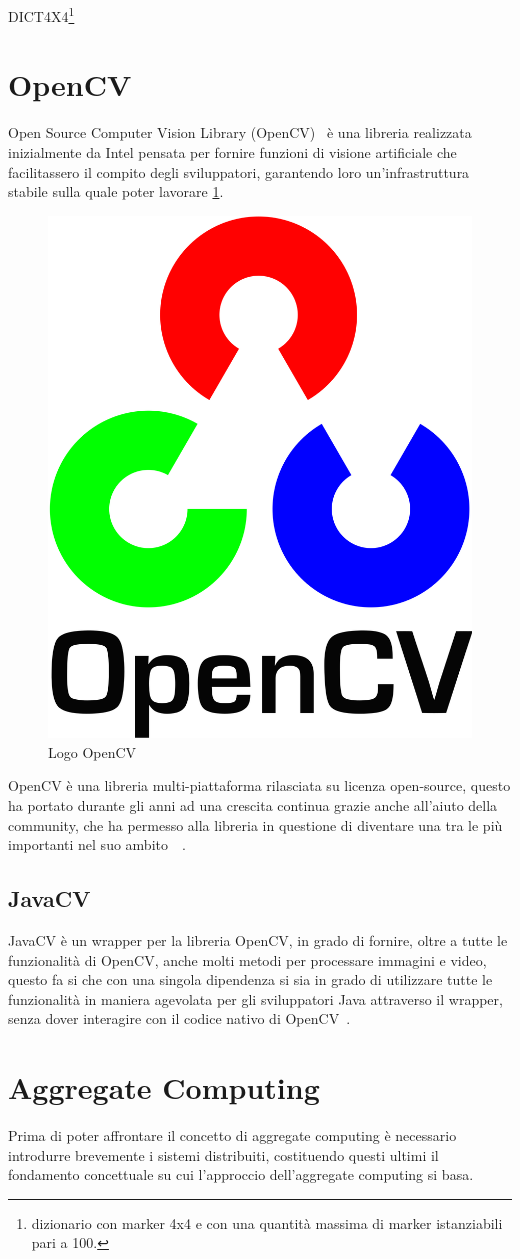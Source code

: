 \documentclass[12pt,a4paper,openright,twoside]{book}
\begin{document}
\begin{center}
	DICT\textunderscore4X4\footnote{dizionario con marker 4x4 e con una quantità massima di marker istanziabili pari a 100.}
\end{center}

\section{OpenCV} \label{sec:opencv}
Open Source Computer Vision Library (OpenCV)~\cite{OpenCVMainPage} è una libreria realizzata inizialmente da Intel pensata per fornire funzioni di visione artificiale che facilitassero il compito degli sviluppatori, garantendo loro un'infrastruttura stabile sulla quale poter lavorare \ref{fig:opencvLogo}.
\begin{figure}[h!]
	\centering
	\includegraphics[width=0.3\linewidth]{figures/opencvLogo.png}
	\caption{Logo OpenCV}
	\label{fig:opencvLogo}
\end{figure}


OpenCV è una libreria multi-piattaforma rilasciata su licenza open-source, questo ha portato durante gli anni ad una crescita continua grazie anche all'aiuto della community, che ha permesso alla libreria in questione di diventare una tra le più importanti nel suo ambito~\cite{baggio2015opencv}~\cite{OpenCVGitHub}.

\subsection{JavaCV} \label{subsec:javacv}
JavaCV è un wrapper per la libreria OpenCV, in grado di fornire, oltre a tutte le funzionalità di OpenCV, anche molti metodi per processare immagini e video, questo fa si che con una singola dipendenza si sia in grado di utilizzare tutte le funzionalità in maniera agevolata per gli sviluppatori Java attraverso il wrapper, senza dover interagire con il codice nativo di OpenCV~\cite{javaCVRepo}.

\section{Aggregate Computing}
Prima di poter affrontare il concetto di aggregate computing è necessario introdurre brevemente i sistemi distribuiti, costituendo questi ultimi il fondamento concettuale su cui l'approccio dell'aggregate computing si basa.
\end{document}
